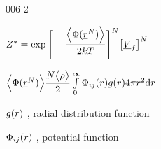 \begin{mitframe}{006-2} %

    
    \begin{listone}
    
    \item $\configint = \exp\Bigg[-\dfrac{\Big\langle\pot(\uline{\pos}^{\nummoles})\Big\rangle}{2\thermcond\Temp}\Bigg]^N\big[\uline{\vol}_{\fug}\big]^{\nummoles}$
    
    
    
    
    	\begin{listtwo}
    
    	\item $\Big\langle\pot(\uline{\pos}^{\nummoles})\Big\rangle \dfrac{\nummoles\big\langle\dens\big\rangle}{2}\int\limits_{0}^{\infty}\potfunc\raddist4\pie\pos^2\mathrm{d}\pos $
        
        
			\begin{listthree}

    		\item $\raddist$ , radial distribution function 
    		\item $\potfunc$ , potential function
    	
        	\end{listthree}
    
    	\end{listtwo}
    
    \end{listone}
    
\end{mitframe}